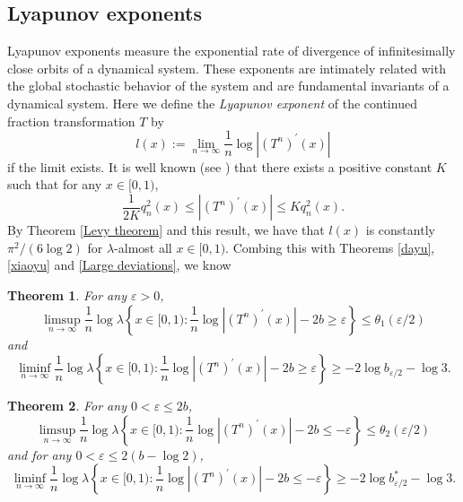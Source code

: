 \documentclass[reqno]{amsart}
\newtheorem{theorem}{Theorem}[section]
\theoremstyle{definition}
\numberwithin{equation}{section}
\begin{document}
\subsection{Lyapunov exponents}
Lyapunov exponents measure the exponential rate of divergence of infinitesimally close orbits of a dynamical system. These exponents are intimately related with the global stochastic behavior of the system and are fundamental invariants of a dynamical system. Here we define the \emph{Lyapunov exponent} of the continued fraction transformation $T$ by
\[
l(x):= \lim\limits_{n \to \infty}\frac{1}{n}\log |(T^n)^{\prime}(x)|
\]
if the limit exists. It is well known (see \cite{lesPW99}) that there exists a positive constant $K$ such that for any $x \in [0,1)$,
\[
\frac{1}{2K}q^2_n(x) \leq |(T^n)^{\prime}(x)| \leq Kq^2_n(x).
\]
By Theorem \ref{Levy theorem} and this result, we have that $l(x)$ is constantly $\pi^2/(6\log2)$ for $\lambda$-almost all $x \in [0,1)$.
Combing this with Theorems \ref{dayu}, \ref{xiaoyu} and \ref{Large deviations}, we know

\begin{theorem}
For any $\varepsilon >0$,
\begin{equation*}
\limsup_{n \to \infty} \frac{1}{n}\log \lambda\left\{x\in [0,1):\frac{1}{n}\log |(T^n)^{\prime}(x)| - 2b \geq \varepsilon\right\} \leq \theta_1(\varepsilon/2)
\end{equation*}
 and
\begin{equation*}
\liminf_{n \to \infty} \frac{1}{n}\log \lambda\left\{x\in [0,1):\frac{1}{n}\log |(T^n)^{\prime}(x)| - 2b \geq \varepsilon\right\} \geq -2\log b_{\varepsilon/2}-\log 3.
\end{equation*}
\end{theorem}

\begin{theorem}
For any $0< \varepsilon \leq 2b$,
\begin{equation*}
\limsup_{n \to \infty} \frac{1}{n}\log\lambda\left\{x\in [0,1):\frac{1}{n}\log |(T^n)^{\prime}(x)| - 2b \leq -\varepsilon\right\} \leq \theta_2(\varepsilon/2)
\end{equation*}
and for any $0< \varepsilon \leq 2(b -\log2)$,
\begin{equation*}
\liminf_{n \to \infty} \frac{1}{n}\log \lambda\left\{x\in [0,1):\frac{1}{n}\log |(T^n)^{\prime}(x)| - 2b \leq -\varepsilon\right\} \geq - 2\log b^\ast_{\varepsilon/2}- \log 3.
\end{equation*}
\end{theorem}
\end{document}
